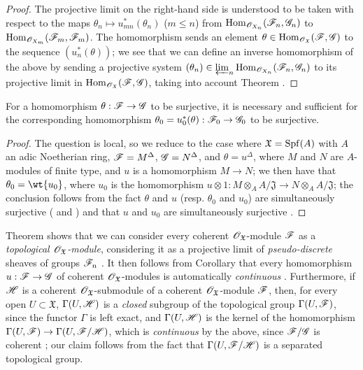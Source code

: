 \begin{proof}
\label{proof-1.10.11.4}
The projective limit on the right-hand side is understood to be taken with respect to the maps $\theta_n\mapsto u_{mn}^*(\theta_n)$ ($m\leq n$) from $\operatorname{Hom}_{\mathscr{O}_{X_n}}(\mathscr{F}_n,\mathscr{G}_n)$ to $\operatorname{Hom}_{\mathscr{O}_{X_m}}(\mathscr{F}_m,\mathscr{F}_m)$.
The homomorphism  sends an element $\theta\in\operatorname{Hom}_{\mathscr{O}_\mathfrak{X}}(\mathscr{F},\mathscr{G})$ to the sequence $(u_n^*(\theta))$; we see that we can define an inverse homomorphism of the above by sending a projective system $(\theta_n)\in\varprojlim_n\operatorname{Hom}_{\mathscr{O}_{X_n}}(\mathscr{F}_n,\mathscr{G}_n)$ to its projective limit in $\operatorname{Hom}_{\mathscr{O}_\mathfrak{X}}(\mathscr{F},\mathscr{G})$, taking into account Theorem .
\end{proof}

\begin{corollary}[10.11.5]
\label{1.10.11.5}
For a homomorphism $\theta:\sh{F}\to\sh{G}$ to be surjective, it is necessary and sufficient for the corresponding homomorphism $\theta_0=u_0^*(\theta):\sh{F}_0\to\sh{G}_0$ to be surjective.
\end{corollary}

\begin{proof}
\label{proof-1.10.11.5}
The question is local, so we reduce to the case where $\mathfrak{X}=\operatorname{Spf}(A)$ with $A$ an adic Noetherian ring, $\mathscr{F}=M^\Delta$, $\mathscr{G}=N^\Delta$, and $\theta=u^\Delta$, where $M$ and $N$ are $A$-modules of finite type, and $u$ is a homomorphism $M\to N$; we then have that $\theta_0=\wt{u_0}$, where $u_0$ is the homomorphism $u\otimes 1:M\otimes_A A/\mathfrak{J}\to N\otimes_A A/\mathfrak{J}$; the conclusion follows from the fact $\theta$ and $u$ (resp. $\theta_0$ and $u_0$) are simultaneously surjective ( and ) and that $u$ and $u_0$ are simultaneously surjective .
\end{proof}

\begin{env}[10.11.6]
\label{1.10.11.6}
Theorem  shows that we can consider every coherent $\mathscr{O}_\mathfrak{X}$-module $\mathscr{F}$ as a \emph{topological $\mathscr{O}_\mathfrak{X}$-module}, considering it as a projective limit of \emph{pseudo-discrete} sheaves of groups $\mathscr{F}_n$ .
It then follows from Corollary  that every homomorphism $u:\sh{F}\to\sh{G}$ of coherent $\mathscr{O}_\mathfrak{X}$-modules is automatically \emph{continuous}
.
Furthermore, if $\mathscr{H}$ is a coherent $\mathscr{O}_\mathfrak{X}$-submodule of a coherent $\mathscr{O}_\mathfrak{X}$-module $\mathscr{F}$, then, for every open $U\subset\mathfrak{X}$, $\Gamma(U,\mathscr{H})$ is a \emph{closed} subgroup of the topological group $\Gamma(U,\mathscr{F})$, since the functor $\Gamma$ is left exact, and $\Gamma(U,\mathscr{H})$ is the kernel of the homomorphism $\Gamma(U,\sh{F})\to\Gamma(U,\sh{F}/\sh{H})$, which is \emph{continuous} by the above, since $\mathscr{F}/\mathscr{G}$ is coherent ; our claim follows from the fact that $\Gamma(U,\mathscr{F}/\mathscr{H})$ is a separated topological group.
\end{env}

